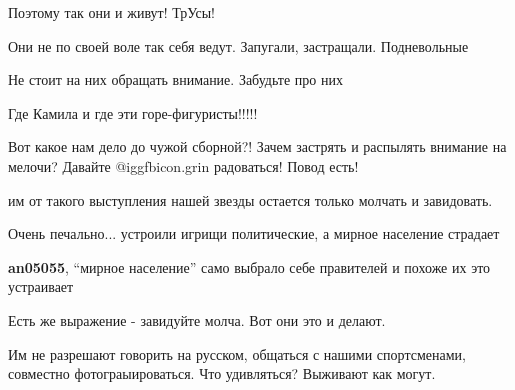 \begin{itemize}

Поэтому так они и живут! ТрУсы!

Они не по своей воле так себя ведут. Запугали, застращали. Подневольные

Не стоит на них обращать внимание. Забудьте про них


Где Камила и где эти горе-фигуристы!!!!!

Вот какое нам дело до чужой сборной?! Зачем застрять и распылять внимание на
мелочи? Давайте  @igg{fbicon.grin}  радоваться! Повод есть!


им от такого выступления нашей звезды остается только молчать и завидовать.

Очень печально... устроили игрищи политические, а мирное население страдает

\textbf{an05055}, \enquote{мирное население} само выбрало себе правителей и похоже их это устраивает


Есть же выражение - завидуйте молча. Вот они это и делают.

Им не разрешают говорить на русском, общаться с нашими спортсменами, совместно
фотограыироваться. Что удивляться? Выживают как могут.

\end{itemize} %
